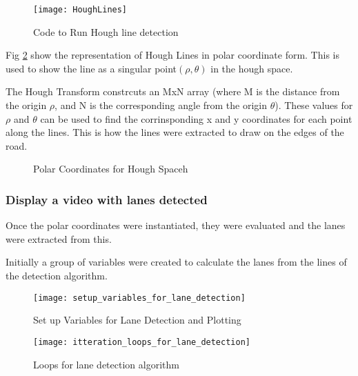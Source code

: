 \documentclass[conference]{IEEEtran}
\begin{document}
\begin{figure}[H]
\centerline{\texttt{[image: HoughLines]}}
\caption{Code to Run Hough line detection}
\label{fig:HoughLines}
\end{figure}

Fig \ref{fig:Polar_Coordinates_for_Hough_transforms} show the representation of Hough Lines in polar coordinate form. This is used to show the line as a singular point$(\rho, \theta)$ in the hough space. 

The Hough Transform constrcuts an MxN array (where M is the distance from the origin $\rho$, and N is the corresponding angle from the origin $\theta$). These values for $\rho$ and $\theta$ can be used to find the corrinsponding x and y coordinates for each point along the lines. This is how the lines were extracted to draw on the edges of the road. 

\begin{figure}[H]
\centering
{}
\caption{Polar Coordinates for Hough Spaceh}
\label{fig:Polar_Coordinates_for_Hough_transforms}
\end{figure} 

\subsubsection{Display a video with lanes detected}

Once the polar coordinates were instantiated, they were evaluated and the lanes were extracted from this. 

Initially a group of variables were created to calculate the lanes from the lines of the detection algorithm. 

\begin{figure}[H]
\centerline{\texttt{[image: setup\_variables\_for\_lane\_detection]}}
\caption{Set up Variables for Lane Detection and Plotting}
\label{fig:setup_variables_for_lane_detection}
\end{figure}

\begin{figure}[H]
\centerline{\texttt{[image: itteration\_loops\_for\_lane\_detection]}}
\caption{Loops for lane detection algorithm}
\label{fig:itteration_loops_for_lane_detection}
\end{figure}
\end{document}
